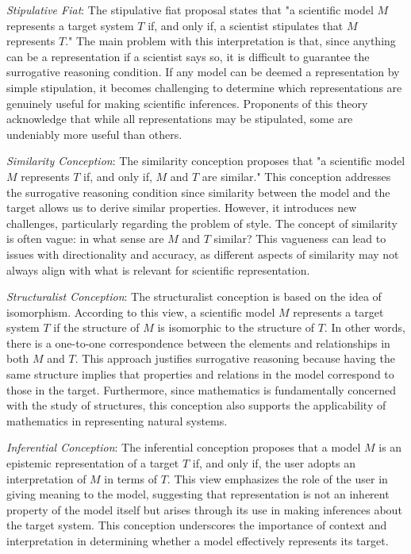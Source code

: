 \emph{Stipulative Fiat}: The stipulative fiat proposal states that "a scientific model $M$ represents a target system $T$ if, and only if, a scientist stipulates that $M$ represents $T$." The main problem with this interpretation is that, since anything can be a representation if a scientist says so, it is difficult to guarantee the surrogative reasoning condition. If any model can be deemed a representation by simple stipulation, it becomes challenging to determine which representations are genuinely useful for making scientific inferences. Proponents of this theory acknowledge that while all representations may be stipulated, some are undeniably more useful than others.

\emph{Similarity Conception}: The similarity conception proposes that "a scientific model $M$ represents $T$ if, and only if, $M$ and $T$ are similar." This conception addresses the surrogative reasoning condition since similarity between the model and the target allows us to derive similar properties. However, it introduces new challenges, particularly regarding the problem of style. The concept of similarity is often vague: in what sense are $M$ and $T$ similar? This vagueness can lead to issues with directionality and accuracy, as different aspects of similarity may not always align with what is relevant for scientific representation.

\emph{Structuralist Conception}: The structuralist conception is based on the idea of isomorphism. According to this view, a scientific model $M$ represents a target system $T$ if the structure of $M$ is isomorphic to the structure of $T$. In other words, there is a one-to-one correspondence between the elements and relationships in both $M$ and $T$. This approach justifies surrogative reasoning because having the same structure implies that properties and relations in the model correspond to those in the target. Furthermore, since mathematics is fundamentally concerned with the study of structures, this conception also supports the applicability of mathematics in representing natural systems.

\emph{Inferential Conception}: The inferential conception proposes that a model $M$ is an epistemic representation of a target $T$ if, and only if, the user adopts an interpretation of $M$ in terms of $T$. This view emphasizes the role of the user in giving meaning to the model, suggesting that representation is not an inherent property of the model itself but arises through its use in making inferences about the target system. This conception underscores the importance of context and interpretation in determining whether a model effectively represents its target.

